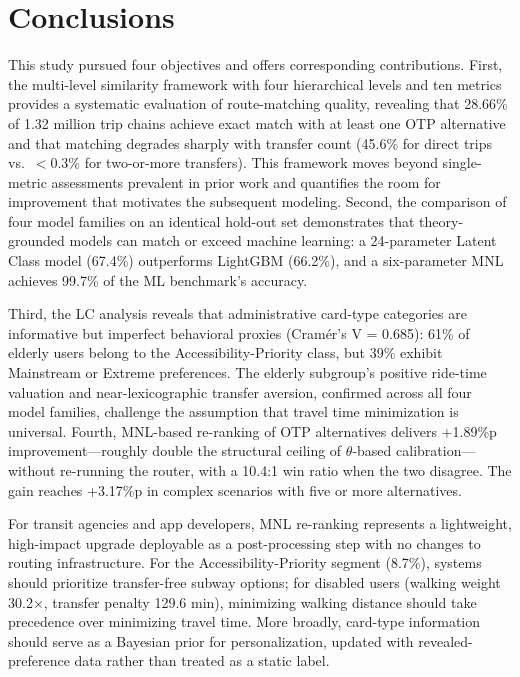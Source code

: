 \section{Conclusions}

This study pursued four objectives and offers corresponding contributions.
First, the multi-level similarity framework with four hierarchical levels and
ten metrics provides a systematic evaluation of route-matching quality,
revealing that 28.66\% of 1.32 million trip chains achieve exact match with at
least one OTP alternative and that matching degrades sharply with transfer
count (45.6\% for direct trips vs.\ $<$0.3\% for two-or-more transfers). This
framework moves beyond single-metric assessments prevalent in prior work and
quantifies the room for improvement that motivates the subsequent modeling.
Second, the comparison of four model families on an identical hold-out set
demonstrates that theory-grounded models can match or exceed machine learning:
a 24-parameter Latent Class model (67.4\%) outperforms LightGBM (66.2\%), and
a six-parameter MNL achieves 99.7\% of the ML benchmark's accuracy.

Third, the LC analysis reveals that administrative card-type categories are
informative but imperfect behavioral proxies (Cram\'er's V = 0.685): 61\% of
elderly users belong to the Accessibility-Priority class, but 39\% exhibit
Mainstream or Extreme preferences. The elderly subgroup's positive ride-time
valuation and near-lexicographic transfer aversion, confirmed across all four
model families, challenge the assumption that travel time minimization is
universal. Fourth, MNL-based re-ranking of OTP alternatives delivers +1.89\%p
improvement---roughly double the structural ceiling of $\theta$-based
calibration---without re-running the router, with a 10.4:1 win ratio when the
two disagree. The gain reaches +3.17\%p in complex scenarios with five or more
alternatives.

For transit agencies and app developers, MNL re-ranking represents a
lightweight, high-impact upgrade deployable as a post-processing step with no
changes to routing infrastructure. For the Accessibility-Priority segment
(8.7\%), systems should prioritize transfer-free subway options; for disabled
users (walking weight 30.2$\times$, transfer penalty 129.6 min), minimizing
walking distance should take precedence over minimizing travel time. More
broadly, card-type information should serve as a Bayesian prior for
personalization, updated with revealed-preference data rather than treated as
a static label.

